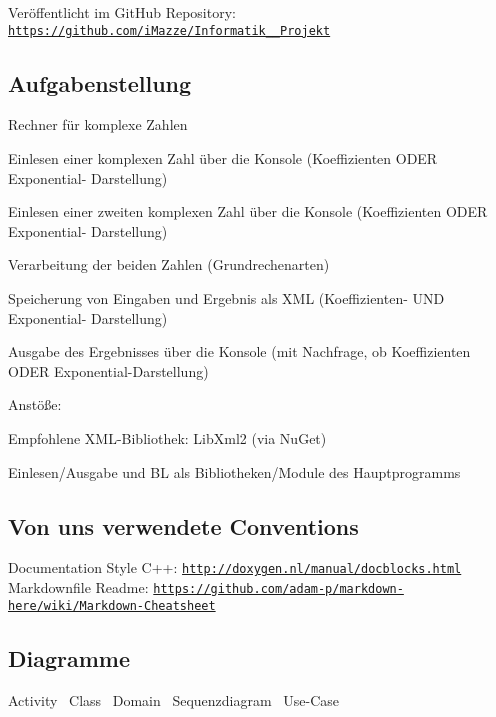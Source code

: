 Veröffentlicht im Git\+Hub Repository\+: \href{https://github.com/iMazze/Informatik_4_Projekt}{\tt https\+://github.\+com/i\+Mazze/\+Informatik\+\_\+\_\+\+Projekt} \subsection*{Aufgabenstellung}

Rechner für komplexe Zahlen
\begin{DoxyItemize}
\item Einlesen einer komplexen Zahl über die Konsole (Koeffizienten O\+D\+ER Exponential-\/ Darstellung)
\item Einlesen einer zweiten komplexen Zahl über die Konsole (Koeffizienten O\+D\+ER Exponential-\/ Darstellung)
\item Verarbeitung der beiden Zahlen (Grundrechenarten)
\item Speicherung von Eingaben und Ergebnis als X\+ML (Koeffizienten-\/ U\+ND Exponential-\/ Darstellung)
\item Ausgabe des Ergebnisses über die Konsole (mit Nachfrage, ob Koeffizienten O\+D\+ER Exponential-\/\+Darstellung)
\end{DoxyItemize}

Anstöße\+:
\begin{DoxyItemize}
\item Empfohlene X\+M\+L-\/\+Bibliothek\+: Lib\+Xml2 (via Nu\+Get)
\item Einlesen/\+Ausgabe und BL als Bibliotheken/\+Module des Hauptprogramms
\end{DoxyItemize}

\subsection*{Von uns verwendete Conventions}

Documentation Style C++\+: \href{http://doxygen.nl/manual/docblocks.html}{\tt http\+://doxygen.\+nl/manual/docblocks.\+html} ~\newline
 Markdownfile Readme\+: \href{https://github.com/adam-p/markdown-here/wiki/Markdown-Cheatsheet}{\tt https\+://github.\+com/adam-\/p/markdown-\/here/wiki/\+Markdown-\/\+Cheatsheet}

\subsection*{Diagramme}

Activity~\newline
  Class~\newline
  Domain~\newline
  Sequenzdiagram~\newline
  Use-\/\+Case~\newline
 

